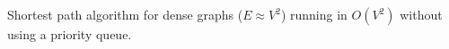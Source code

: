 
Shortest path algorithm for dense graphs ($E \approx V^2$) running in $O(V^2)$ without using a priority queue.


